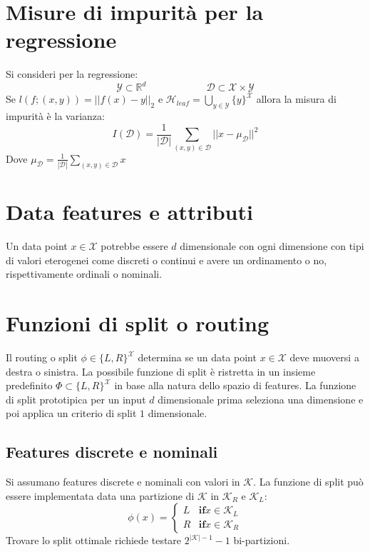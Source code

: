\section{Misure di impurit\`a per la regressione}
Si consideri per la regressione:
	$$\mathcal{Y}\subset\mathbb{R}^d\qquad\qquad\qquad\mathcal{D}\subset\mathcal{X}\times\mathcal{Y}$$
Se $l(f;(x,y))=||f(x)-y||_2$ e $\mathcal{H}_{leaf} = \bigcup\limits_{y\in\mathcal{Y}}\{y\}^\mathcal{X}$ allora la misura di impurit\`a \`e la varianza:
$$I(\mathcal{D})=\dfrac{1}{|\mathcal{D}|}\sum\limits_{(x,y)\in\mathcal{D}}||x-\mu_\mathcal{D}||^2$$
Dove $\mu_\mathcal{D} = \frac{1}{|\mathcal{D}|}\sum\limits_{(x,y)\in\mathcal{D}}x$

\section{Data features e attributi}
Un data point $x\in\mathcal{X}$ potrebbe essere $d$ dimensionale con ogni dimensione con tipi di valori eterogenei come discreti o continui e avere un ordinamento o no, rispettivamente ordinali o nominali.

\section{Funzioni di split o routing}
Il routing o split $\phi\in\{L,R\}^{\mathcal{X}}$ determina se un data point $x\in\mathcal{X}$ deve muoversi a destra o sinistra.
La possibile funzione di split \`e ristretta in un insieme predefinito $\Phi\subset\{L,R\}^\mathcal{X}$ in base alla natura dello spazio di features.
La funzione di split prototipica per un input $d$ dimensionale prima seleziona una dimensione e poi applica un criterio di split $1$ dimensionale.

	\subsection{Features discrete e nominali}
	Si assumano features discrete e nominali con valori in $\mathcal{K}$.
	La funzione di split pu\`o essere implementata data una partizione di $\mathcal{K}$ in $\mathcal{K}_R$ e $\mathcal{K}_L$:
	$$\phi(x) = \begin{cases}L &\mathbf{if} x\in\mathcal{K}_L\\
		 								  R &\mathbf{if} x\in\mathcal{K}_R
				 \end{cases}$$
	Trovare lo split ottimale richiede testare $2^{|\mathcal{K}|-1}-1$ bi-partizioni.


